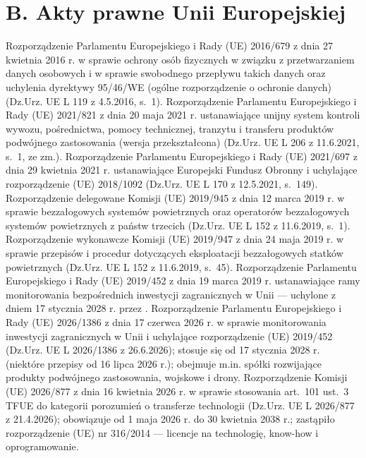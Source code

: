\section*{B. Akty prawne Unii Europejskiej}
\begin{BibList}
 Rozporządzenie Parlamentu Europejskiego i Rady (UE) 2016/679 z dnia 27 kwietnia 2016 r. w sprawie ochrony osób fizycznych w związku z przetwarzaniem danych osobowych i w sprawie swobodnego przepływu takich danych oraz uchylenia dyrektywy 95/46/WE (ogólne rozporządzenie o ochronie danych) (Dz.Urz. UE L 119 z 4.5.2016, s.~1).
 Rozporządzenie Parlamentu Europejskiego i Rady (UE) 2021/821 z dnia 20 maja 2021 r. ustanawiające unijny system kontroli wywozu, pośrednictwa, pomocy technicznej, tranzytu i transferu produktów podwójnego zastosowania (wersja przekształcona) (Dz.Urz. UE L 206 z 11.6.2021, s.~1, ze zm.).
 Rozporządzenie Parlamentu Europejskiego i Rady (UE) 2021/697 z dnia 29 kwietnia 2021 r. ustanawiające Europejski Fundusz Obronny i uchylające rozporządzenie (UE) 2018/1092 (Dz.Urz. UE L 170 z 12.5.2021, s.~149).
 Rozporządzenie delegowane Komisji (UE) 2019/945 z dnia 12 marca 2019 r. w sprawie bezzałogowych systemów powietrznych oraz operatorów bezzałogowych systemów powietrznych z państw trzecich (Dz.Urz. UE L 152 z 11.6.2019, s.~1).
 Rozporządzenie wykonawcze Komisji (UE) 2019/947 z dnia 24 maja 2019 r. w sprawie przepisów i procedur dotyczących eksploatacji bezzałogowych statków powietrznych (Dz.Urz. UE L 152 z 11.6.2019, s.~45).
 Rozporządzenie Parlamentu Europejskiego i Rady (UE) 2019/452 z dnia 19 marca 2019 r. ustanawiające ramy monitorowania bezpośrednich inwestycji zagranicznych w Unii --- uchylone z dniem 17 stycznia 2028 r. przez .
 Rozporządzenie Parlamentu Europejskiego i Rady (UE) 2026/1386 z dnia 17 czerwca 2026 r. w sprawie monitorowania inwestycji zagranicznych w Unii i uchylające rozporządzenie (UE) 2019/452 (Dz.Urz. UE L 2026/1386 z 26.6.2026); stosuje się od 17 stycznia 2028 r. (niektóre przepisy od 16 lipca 2026 r.); obejmuje m.in. spółki rozwijające produkty podwójnego zastosowania, wojskowe i drony.
 Rozporządzenie Komisji (UE) 2026/877 z dnia 16 kwietnia 2026 r. w sprawie stosowania art.~101 ust.~3 TFUE do kategorii porozumień o transferze technologii (Dz.Urz. UE L 2026/877 z 21.4.2026); obowiązuje od 1 maja 2026 r. do 30 kwietnia 2038 r.; zastąpiło rozporządzenie (UE) nr 316/2014 --- licencje na technologię, know-how i oprogramowanie.

\end{BibList}
